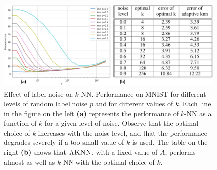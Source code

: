 \documentclass{article}
\newcommand{\algname}{\textsc{AKNN}}
\begin{document}
\begin{figure}[t]
\begin{center}
\includegraphics[width=0.9\linewidth, height=1.8in]{figs/combined_figure.png}
\end{center}
\caption{%
  Effect of label noise on $k$-NN.
  Performance on MNIST for different levels of random label noise $p$
  and for different values of $k$. Each line in the figure on the left {\bf (a)}
  represents the performance of $k$-NN as a function of $k$ for a
  given level of noise. Observe that the optimal choice of $k$
  increases with the noise level, and that the performance degrades
  severely if a too-small value of $k$ is used. The table on the right {\bf (b)}
  shows that $\algname$, with a fixed value of $A$, performs almost as well
  as $k$-NN with the optimal choice of $k$.}
\label{fig:mnist}
\end{figure}
\end{document}
